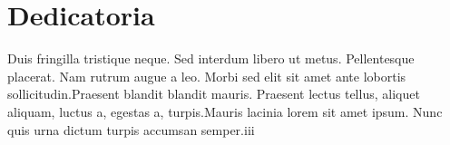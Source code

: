          
\chapter{Dedicatoria}
Duis fringilla tristique neque. Sed interdum libero ut metus.
Pellentesque placerat. Nam rutrum augue a leo. Morbi sed 
elit sit amet ante lobortis sollicitudin.Praesent blandit 
blandit mauris. Praesent lectus tellus, aliquet aliquam,
luctus a, egestas a, turpis.Mauris lacinia lorem sit amet
ipsum. Nunc quis urna dictum turpis accumsan semper.iii
